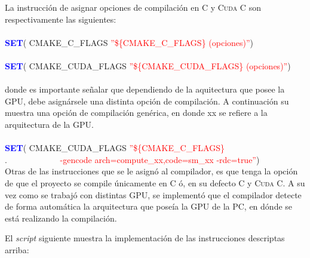 La instrucción de asignar opciones de compilación en \textsc{C} y \textsc{Cuda C} son respectivamente las siguientes:
\\\\
\textcolor{blue}{\textbf{SET}}( CMAKE\_C\_FLAGS  \textcolor{red}{''\$\{CMAKE\_C\_FLAGS\} (opciones)''})
\\\\
\textcolor{blue}{\textbf{SET}}( CMAKE\_CUDA\_FLAGS  \textcolor{red}{''\$\{CMAKE\_CUDA\_FLAGS\} (opciones)''})
\\
\\
donde es importante señalar que dependiendo de la aquitectura que posee la GPU, debe asignársele una distinta opción de compilación. A continuación su muestra una opción de compilación genérica, en donde xx se refiere a la arquitectura de la GPU.
\\
\\
\textcolor{blue}{\textbf{SET}}( CMAKE\_CUDA\_FLAGS \textcolor{red}{''\$\{CMAKE\_C\_FLAGS\}}\\
                 $.\qquad \qquad \qquad $\textcolor{red}{ -gencode arch=compute\_xx,code=sm\_xx -rdc=true''})
\\


Otras de las instrucciones que se le asignó al compilador, es que tenga la opción de que el proyecto se  compile únicamente en \textsc{C} ó, en su defecto  \textsc{C} y \textsc{Cuda C}. A su vez como se trabajó con distintas GPU, se implementó que el compilador detecte de forma automática la arquitectura que poseía la GPU de la PC, en dónde se está realizando la compilación. 

El \textit{script} siguiente muestra la implementación de las instrucciones descriptas arriba:
\newpage

